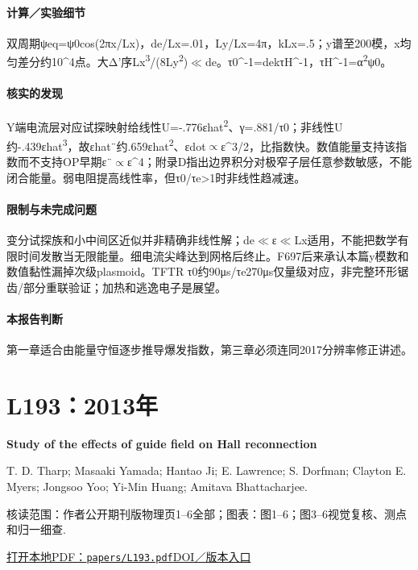 \paragraph{计算／实验细节}双周期ψeq=ψ0cos(2πx/Lx)，de/Lx=.01，Ly/Lx=4π，kLx=.5；y谱至200模，x均匀差分约10\textasciicircum{}4点。大Δ'序Lx\textsuperscript{3}/(8Ly\textsuperscript{2})\ensuremath{\ll}de。τ0\textasciicircum{}-1=dekτH\textasciicircum{}-1，τH\textasciicircum{}-1=α\textsuperscript{2}ψ0。

\paragraph{核实的发现}Y端电流层对应试探映射给线性U=-.776εhat\textsuperscript{2}、γ=.881/τ0；非线性U约-.439εhat\textsuperscript{3}，故εhat¨约.659εhat\textsuperscript{2}、εdot\ensuremath{\propto}ε\textasciicircum{}3/2，比指数快。数值能量支持该指数而不支持OP早期ε¨\ensuremath{\propto}ε\textasciicircum{}4；附录D指出边界积分对极窄子层任意参数敏感，不能闭合能量。弱电阻提高线性率，但τ0/τe>1时非线性趋减速。

\paragraph{限制与未完成问题}变分试探族和小中间区近似并非精确非线性解；de\ensuremath{\ll}ε\ensuremath{\ll}Lx适用，不能把数学有限时间发散当无限能量。细电流尖峰达到网格后终止。F697后来承认本篇y模数和数值黏性漏掉次级plasmoid。TFTR τ0约90μs/τe270μs仅量级对应，非完整环形锯齿/部分重联验证；加热和逃逸电子是展望。

\paragraph{本报告判断}第一章适合由能量守恒逐步推导爆发指数，第三章必须连同2017分辨率修正讲述。

\section{L193：2013年}\label{paper:L193}

\textbf{Study of the effects of guide field on Hall reconnection}\citep{L193}\

T. D. Tharp;  Masaaki Yamada;  Hantao Ji;  E. Lawrence;  S. Dorfman;  Clayton E. Myers;  Jongsoo Yoo;  Yi-Min Huang;  Amitava Bhattacharjee.

\textsf{核读范围：}作者公开期刊版物理页1–6全部；\textsf{图表：}图1–6；图3–6视觉复核、测点和归一细查.

\href{run:papers/L193.pdf}{打开本地PDF：\texttt{papers/L193.pdf}}\quad\href{https://doi.org/10.1063/1.4805244}{DOI／版本入口}

